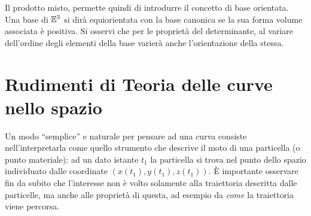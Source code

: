 Il prodotto misto, permette quindi di introdurre il concetto di base orientata. 
Una base di 
$\mathbb{E}^{3}$ si dirà equiorientata con la base canonica se la sua forma volume 
associata 
è positiva. Si osservi che per le proprietà del determinante, al variare 
dell'ordine 
degli elementi della base varierà anche l'orientazione della stessa.


%



\section{Rudimenti di Teoria delle curve nello spazio}
Un modo ``semplice'' e naturale per pensare ad una curva consiste 
nell'interpretarla 
come quello strumento che descrive il moto di una particella (o punto 
materiale): 
ad un dato istante $t_1$ la particella si trova nel punto dello spazio 
individuato dalle
coordinate $(x(t_1),y(t_1),z(t_1))$. \`E importante osservare fin da subito che 
l'interesse
non è volto solamente alla traiettoria descritta dalle particelle, ma anche 
alle proprietà
di questa, ad esempio da \textit{come} la traiettoria viene percorsa. 


